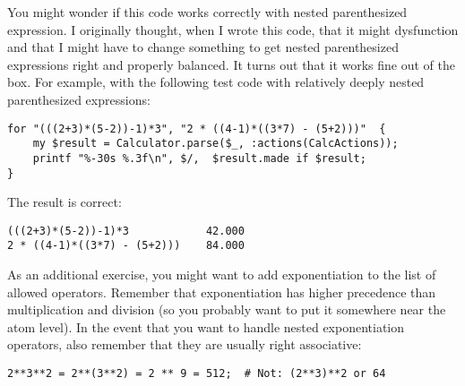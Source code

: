 You might wonder if this code works correctly with nested 
parenthesized expression. I originally thought, when I wrote this 
code, that it might dysfunction and that I might have to change 
something to get nested parenthesized expressions right and 
properly balanced. It turns out that it works fine out of the 
box. For example, with the following test code with relatively 
deeply nested parenthesized expressions:

\begin{verbatim}
for "(((2+3)*(5-2))-1)*3", "2 * ((4-1)*((3*7) - (5+2)))"  { 
    my $result = Calculator.parse($_, :actions(CalcActions));
    printf "%-30s %.3f\n", $/,  $result.made if $result;
}
\end{verbatim}

The result is correct:
\begin{verbatim}
(((2+3)*(5-2))-1)*3            42.000
2 * ((4-1)*((3*7) - (5+2)))    84.000
\end{verbatim}

As an additional exercise, you might want to add exponentiation 
to the list of allowed operators. Remember that exponentiation has 
higher precedence than multiplication and division (so you probably 
want to put it somewhere near the atom level). In the event that 
you want to handle nested exponentiation operators, also 
remember that they are usually right associative:

\begin{verbatim}
2**3**2 = 2**(3**2) = 2 ** 9 = 512;  # Not: (2**3)**2 or 64
\end{verbatim}

